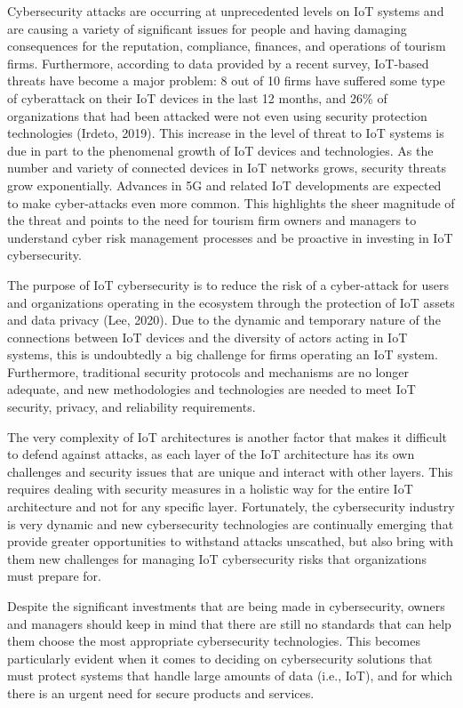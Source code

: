 \documentclass[
  letterpaper,
  DIV=11,
  numbers=noendperiod]{scrreprt}
\begin{document}
Cybersecurity attacks are occurring at unprecedented levels on IoT
systems and are causing a variety of significant issues for people and
having damaging consequences for the reputation, compliance, finances,
and operations of tourism firms. Furthermore, according to data provided
by a recent survey, IoT-based threats have become a major problem: 8 out
of 10 firms have suffered some type of cyberattack on their IoT devices
in the last 12 months, and 26\% of organizations that had been attacked
were not even using security protection technologies (Irdeto, 2019).
This increase in the level of threat to IoT systems is due in part to
the phenomenal growth of IoT devices and technologies. As the number and
variety of connected devices in IoT networks grows, security threats
grow exponentially. Advances in 5G and related IoT developments are
expected to make cyber-attacks even more common. This highlights the
sheer magnitude of the threat and points to the need for tourism firm
owners and managers to understand cyber risk management processes and be
proactive in investing in IoT cybersecurity.

The purpose of IoT cybersecurity is to reduce the risk of a cyber-attack
for users and organizations operating in the ecosystem through the
protection of IoT assets and data privacy (Lee, 2020). Due to the
dynamic and temporary nature of the connections between IoT devices and
the diversity of actors acting in IoT systems, this is undoubtedly a big
challenge for firms operating an IoT system. Furthermore, traditional
security protocols and mechanisms are no longer adequate, and new
methodologies and technologies are needed to meet IoT security, privacy,
and reliability requirements.

The very complexity of IoT architectures is another factor that makes it
difficult to defend against attacks, as each layer of the IoT
architecture has its own challenges and security issues that are unique
and interact with other layers. This requires dealing with security
measures in a holistic way for the entire IoT architecture and not for
any specific layer. Fortunately, the cybersecurity industry is very
dynamic and new cybersecurity technologies are continually emerging that
provide greater opportunities to withstand attacks unscathed, but also
bring with them new challenges for managing IoT cybersecurity risks that
organizations must prepare for.

Despite the significant investments that are being made in
cybersecurity, owners and managers should keep in mind that there are
still no standards that can help them choose the most appropriate
cybersecurity technologies. This becomes particularly evident when it
comes to deciding on cybersecurity solutions that must protect systems
that handle large amounts of data (i.e., IoT), and for which there is an
urgent need for secure products and services.
\end{document}
